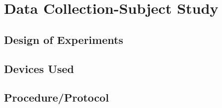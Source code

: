\chapter{Data Collection-Subject Study}

\section{Design of Experiments}
\section{Devices Used}
\section{Procedure/Protocol}
